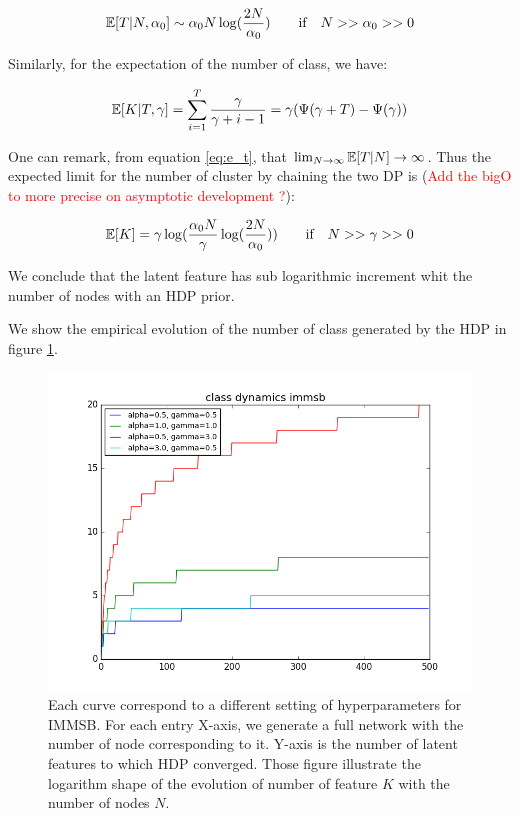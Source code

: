 \begin{equation} \label{eq:e_t}
\E[T|N, \alpha_0] \sim \alpha_0 N \log(\frac{2N}{\alpha_0}) \qquad \text{if} \quad N >> \alpha_0 >> 0
\end{equation}

Similarly, for the expectation of the number of class, we have:

\begin{equation}
\mathbb{E}[K|T, \gamma] = \sum_{i=1}^{T} \frac{\gamma}{\gamma +i-1} = \gamma (\Psi(\gamma+T) - \Psi(\gamma))
\end{equation}

One can remark, from equation \eqref{eq:e_t}, that $\lim_{N\to\infty} \mathbb{E}[T|N] \to  \infty$. Thus the expected limit for the number of cluster by chaining the two DP is (\textcolor{red}{Add the bigO to more precise on asymptotic development ?}):

\begin{equation}
\mathbb{E}[K] = \gamma \log(\frac{\alpha_0 N}{\gamma}\log(\frac{2N}{\alpha_0} )) \qquad \textnormal{if} \quad N >> \gamma>>0
\end{equation}

We conclude that the latent feature has sub logarithmic increment whit the number of nodes with	 an HDP prior.

We show the empirical evolution of the number of class generated by the HDP in figure \ref{fig:gen_dyn}.

\begin{figure}[h]
	\centering
	
	\includegraphics[scale=0.4]{img/class_dynamics}

	\caption{Each curve correspond to a different setting of hyperparameters for IMMSB. For each entry X-axis, we generate a full network with the number of node corresponding to it. Y-axis is the number of latent features to which HDP converged. Those figure illustrate the logarithm shape of the evolution of number of feature $K$ with the number of nodes $N$.}
	\label{fig:gen_dyn}
\end{figure}

